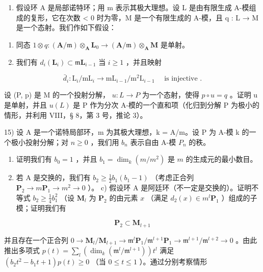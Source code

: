 \begin{enumerate}
\def\labelenumi{\arabic{enumi})}
\setcounter{enumi}{13}
\tightlist
\item
  假设环 A 是局部诺特环；用 m 表示其极大理想。设 L 是由有限生成 A-模组成的复形，它在次数 \textless{} 0 时为零，M 是一个有限生成的 A-模，且 q : L → M 是一个态射。我们作如下假设：
\end{enumerate}

\begin{enumerate}
\def\labelenumi{(\roman{enumi})}
\item
  同态 \(1 \otimes q : (\mathbf{A}/\mathfrak{m}) \otimes_{\mathbf{A}} \mathbf{L}_{0} \to (\mathbf{A}/\mathfrak{m}) \otimes_{\mathbf{A}} \mathbf{M}\) 是单射。
\item
  我们有 \(d_{i}(\mathbf{L}_{i})\subset \mathfrak{m}\mathbf{L}_{i - 1}\) 当 \(i\geqslant 1\) ，并且映射
\end{enumerate}

\[
\bar {d} _ {i}: \mathrm{L} _ {i} / \mathrm{mL} _ {i} \rightarrow \mathrm{mL} _ {i - 1} / \mathrm{m} ^ {2} \mathrm{L} _ {i - 1} \quad \text { is injective }.
\]

设 (P, p) 是 M 的一个投射分解， \(u : L \to P\) 为一个态射，使得 \(p \circ u = q\) 。证明 u 是单射，并且 \(u(L)\) 是 P 作为分次 A-模的一个直和项（化归到分解 P 为极小的情形，并利用 VIII，§ 8，第 3 号，推论 3）。

15) 设 A 是一个诺特局部环，m 为其极大理想，k = A/m。设 P 为 A-模 k 的一个极小投射分解；对 \(n \geqslant 0\) ，我们用 \(b_{n}\) 表示自由 A-模 \(P_{n}\) 的秩。

\begin{enumerate}
\def\labelenumi{\alph{enumi})}
\item
  证明我们有 \(b_0 = 1\) ，并且 \(b_1 = \dim_k (m/m^2)\) 是 \(m\) 的生成元的最小数目。
\item
  若 A 是交换的，我们有 \(b_{2} \geqslant \frac{1}{2} b_{1}(b_{1} - 1)\) （考虑正合列 \(\mathbf{P}_{2} \to m\mathbf{P}_{1} \to m^{2} \to 0\) ）。 c) 假设环 A 是阿廷环（不一定是交换的）。证明不等式 \(b_{2} \geqslant \frac{1}{4} b_{1}^{2}\) （设 \(\mathbf{M}_{l}\) 为 \(\mathbf{P}_{2}\) 的由元素 \(x\) （满足 \(d_{2}(x) \in m^{l}\mathbf{P}_{1}\) ）组成的子模；证明我们有
\end{enumerate}

\[
\mathbf {P} _ {2} \subset \mathbf {M} _ {l + 1}
\]

并且存在一个正合列 \(0 \to \mathbf{M}_l / \mathbf{M}_{l+1} \to \mathfrak{m}^l \mathbf{P}_1 / \mathfrak{m}^{l+1} \mathbf{P}_1 \to \mathfrak{m}^{l+1} / \mathfrak{m}^{l+2} \to 0\) 。由此推出多项式 \(p(t) = \sum_{l} (\dim_k (\mathfrak{m}^l / \mathfrak{m}^{l+1})) t^l\) 满足 \((b_2 t^2 - b_1 t + 1)p(t) \geqslant 0\) （当 \(0 \leqslant t \leqslant 1\) ）。通过分别考察情形

